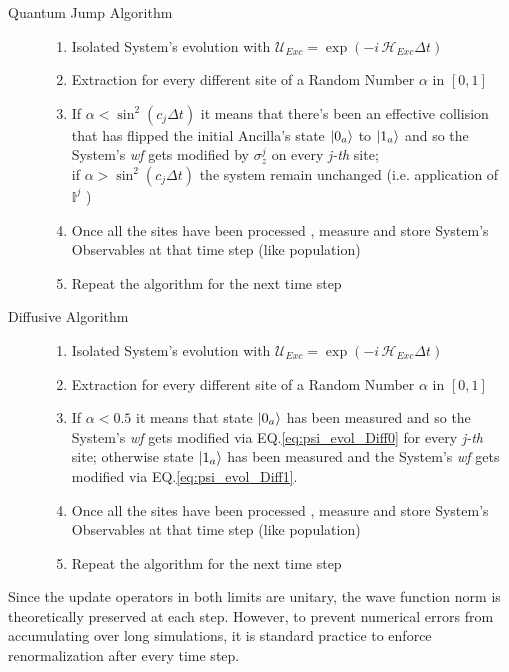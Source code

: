 \documentclass[a4paper,12pt]{article}
\begin{document}
	\begin{description}
		\item[Quantum Jump Algorithm] \leavevmode
		\begin{enumerate}
			\item Isolated System's evolution with $ \mathcal{U}_{Exc} = \exp{\left( -i \, \mathcal{H}_{Exc} \Delta t \right) }$
			\item Extraction for every different site of a Random Number $\alpha$ in $[0,1]$
			\item If $ \alpha < \sin^{2}{\left(c_j \Delta t\right)} $ it means that there's been an effective collision that has flipped the initial Ancilla's state $ \ket{0_a} $ to $ \ket{1_a} $ and so the System's \textit{wf} gets modified by $ \sigma_{z}^{j} $ on every \textit{j-th} site; \\
			if $ \alpha > \sin^{2}{\left(c_j \Delta t\right)} $ the system remain unchanged (i.e. application of $ \mathbb{I}^j $ )
			\item Once all the sites have been processed , measure and store System's Observables at that time step (like population)
			\item Repeat the algorithm for the next time step
		\end{enumerate}
		\item[Diffusive Algorithm] \leavevmode
		\begin{enumerate}
			\item Isolated System's evolution with $ \mathcal{U}_{Exc} = \exp{\left( -i \, \mathcal{H}_{Exc} \Delta t \right) }$
			\item Extraction for every different site of a Random Number 	$\alpha$ in $[0,1]$
			\item If $ \alpha < 0.5 $ it means that state $ \ket{0_a} $ has been measured and so the System's \textit{wf} gets modified via EQ.\eqref{eq:psi_evol_Diff0} for every \textit{j-th} site;
			otherwise state $ \ket{1_a} $ has been measured and the System's \textit{wf} gets modified via EQ.\eqref{eq:psi_evol_Diff1}.
			\item Once all the sites have been processed , measure and store System's Observables at that time step (like population)
			\item Repeat the algorithm for the next time step
		\end{enumerate}
	\end{description}

	Since the update operators in both limits are unitary, the wave function norm is theoretically preserved at each step. However, to prevent numerical errors from accumulating over long simulations, it is standard practice to enforce renormalization after every time step.
\end{document}
